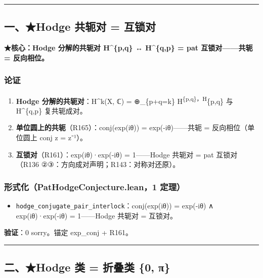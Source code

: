 \documentclass[
]{article}
\providecommand{\tightlist}{%
 \setlength{\itemsep}{0pt}\setlength{\parskip}{0pt}}
\begin{document}
\begin{center}\rule{0.5\linewidth}{0.5pt}\end{center}

\subsection{一、★Hodge 共轭对 =
互锁对}\label{ux4e00hodge-ux5171ux8f6dux5bf9-ux4e92ux9501ux5bf9}

\textbf{★核心：Hodge 分解的共轭对 H\^{}\{p,q\} ↔ H\^{}\{q,p\} = pat
互锁对------共轭 = 反向相位。}

\subsubsection{论证}\label{ux8bbaux8bc1}

\begin{enumerate}
\def\labelenumi{\arabic{enumi}.}
\tightlist
\item
 \textbf{Hodge 分解的共轭对}：H\^{}k(X, ℂ) = ⊕\_\{p+q=k\}
 H\textsuperscript{\{p,q\}，H}\{p,q\} 与 H\^{}\{q,p\} 复共轭成对。
\item
 \textbf{单位圆上的共轭}（R165）：conj(exp(iθ)) = exp(-iθ)------共轭 =
 反向相位（单位圆上 conj z = z⁻¹）。
\item
 \textbf{互锁对}（R161）：exp(iθ)·exp(-iθ) = 1------Hodge 共轭对 = pat
 互锁对（R136 ②③：方向成对声明；R143：对称对还原）。
\end{enumerate}

\subsubsection{形式化（PatHodgeConjecture.lean，1
定理）}\label{ux5f62ux5f0fux5316pathodgeconjecture.lean1-ux5b9aux7406}

\begin{itemize}
\tightlist
\item
 \texttt{hodge\_conjugate\_pair\_interlock}：conj(exp(iθ)) = exp(-iθ) ∧
 exp(iθ)·exp(-iθ) = 1------Hodge 共轭对 = 互锁对。
\end{itemize}

\textbf{验证}：0 sorry。锚定 exp\_conj + R161。

\begin{center}\rule{0.5\linewidth}{0.5pt}\end{center}

\subsection{二、★Hodge 类 = 折叠类 \{0,
π\}}\label{ux4e8chodge-ux7c7b-ux6298ux53e0ux7c7b-0-ux3c0}
\end{document}
